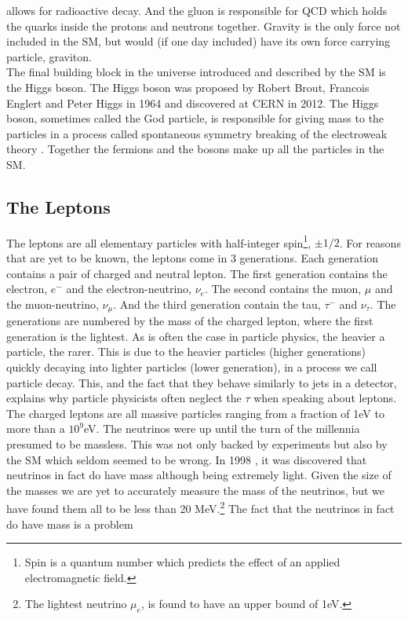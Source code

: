 allows for radioactive decay. And the gluon is responsible for \ac{QCD} which holds the quarks inside the protons and 
neutrons together. Gravity is the only force not included in the SM, but would (if one day included)
have its own force carrying particle, graviton. 
\\
The final building block in the universe introduced and described by the \ac{SM} is the Higgs boson.
The Higgs boson was proposed by Robert Brout, Francois Englert and Peter Higgs in 1964 and discovered at CERN in 2012. The Higgs boson,
sometimes called the God particle, is responsible for giving mass to the particles in a process called
spontaneous symmetry breaking of the electroweak theory \cite{SSB}. Together the fermions and the bosons make up all the 
particles in the \ac{SM}.
\subsection{The Leptons} 
The leptons are all elementary particles with half-integer spin\footnote{Spin is a quantum number
which predicts the effect of an applied electromagnetic field.}, $\pm 1/2$. For reasons that are yet to be known, the 
leptons come in 3 generations. Each generation contains a pair of charged and neutral lepton. The first generation contains the
electron, $e^-$ and the electron-neutrino, $\nu_e$. The second contains the muon, $\mu$ and the
muon-neutrino, $\nu_\mu$. And the third generation contain the tau, $\tau^-$ and $\nu_\tau$. The generations
are numbered by the mass of the charged lepton, where the first generation is the lightest. As is often the case
in particle physics, the heavier a particle, the rarer. This is due to the heavier particles (higher generations) quickly
decaying into lighter particles (lower generation), in a process we call particle decay. This, and the fact that they 
behave similarly to jets in a detector, explains why particle physicists often neglect the $\tau$ when speaking about 
leptons.
\\
The charged leptons are all massive particles ranging from a fraction of 1eV to more than a $10^9$eV.
The neutrinos were up until the turn of the millennia presumed to be massless. This was not only backed by experiments
but also by the SM which seldom seemed to be wrong. In 1998 \cite{NeutrinoMass}, it was discovered that neutrinos in fact do have mass
although being extremely light. Given the size of the masses we are yet to accurately measure the mass of the neutrinos,
but we have found them all to be less than 20 MeV.\footnote{The lightest neutrino $\mu_e$, is found to have an upper bound
of 1eV.} The fact that the neutrinos in fact do have mass is a problem 
